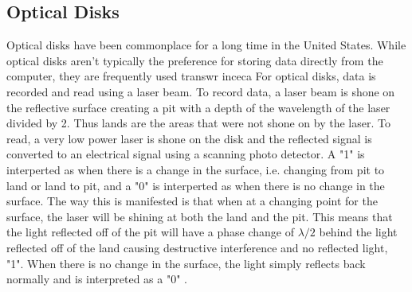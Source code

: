 \documentclass[ notitlepage, numerical, 11pt]{revtex4-1} %
\begin{document}
\subsection{Optical Disks}
Optical disks have been commonplace for a long time in the United States. While optical disks aren't typically the preference for storing data directly from the computer, they are frequently used transwr inceca For optical disks, data is recorded and read using a laser beam. To record data, a laser beam is shone on the reflective surface creating a pit with a depth of the wavelength of the laser divided by 2. Thus lands are the areas that were not shone on by the laser. To read, a very low power laser is shone on the disk and the reflected signal is converted to an electrical signal using a scanning photo detector. A "1" is interperted as when there is a change in the surface, i.e. changing from pit to land or land to pit, and a "0" is interperted as when there is no change in the surface. The way this is manifested is that when at a changing point for the surface, the laser will be shining at both the land and the pit. This means that the light reflected off of the pit will have a phase change of $\lambda/2$ behind the light reflected off of the land causing destructive interference and no reflected light, "1". When there is no change in the surface, the light simply reflects back normally and is interpreted as a "0" \cite{memory}.
\end{document}
